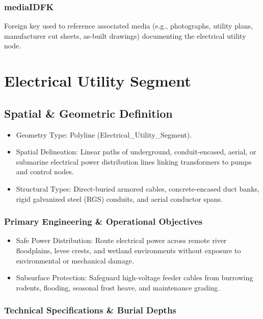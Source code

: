 \documentclass[
  letterpaper,
  DIV=11,
  numbers=noendperiod]{scrreprt}
\begin{document}
\subsection{mediaIDFK}\label{mediaidfk-19}

Foreign key used to reference associated media (e.g., photographs,
utility plans, manufacturer cut sheets, as-built drawings) documenting
the electrical utility node.

\chapter{Electrical Utility Segment}\label{electrical-utility-segment}

\section{Spatial \& Geometric
Definition}\label{spatial-geometric-definition-20}

\begin{itemize}
\item
  Geometry Type: Polyline (Electrical\_Utility\_Segment).
\item
  Spatial Delineation: Linear paths of underground, conduit-encased,
  aerial, or submarine electrical power distribution lines linking
  transformers to pumps and control nodes.
\item
  Structural Types: Direct-buried armored cables, concrete-encased duct
  banks, rigid galvanized steel (RGS) conduits, and aerial conductor
  spans.
\end{itemize}

\subsection{Primary Engineering \& Operational
Objectives}\label{primary-engineering-operational-objectives-2}

\begin{itemize}
\item
  Safe Power Distribution: Route electrical power across remote river
  floodplains, levee crests, and wetland environments without exposure
  to environmental or mechanical damage.
\item
  Subsurface Protection: Safeguard high-voltage feeder cables from
  burrowing rodents, flooding, seasonal frost heave, and maintenance
  grading.
\end{itemize}

\subsection{Technical Specifications \& Burial
Depths}\label{technical-specifications-burial-depths}
\end{document}
